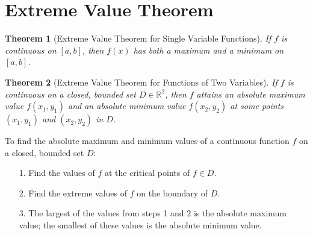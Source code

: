 \documentclass[10pt]{report}
\newtheorem{thm2}{Theorem}[section]
\begin{document}
\section{Extreme Value Theorem}
\begin{thm2}[Extreme Value Theorem for Single Variable Functions]
If $f$ is continuous on $[a,b]$, then $f(x)$ has both a maximum and a minimum on $[a,b]$.
\end{thm2}
\begin{thm2}[Extreme Value Theorem for Functions of Two Variables]
If $f$ is continuous on a closed, bounded set $D\in\mathbb{R}^2$, then $f$ attains an absolute maximum value $f(x_1,y_1)$ and an absolute minimum value $f(x_2,y_2)$ at some points $(x_1,y_1)$ and $(x_2,y_2)$ in $D$. 
\end{thm2}
To find the absolute maximum and minimum values of a continuous function $f$ on a closed, bounded set $D$:
\begin{itemize}
\item[1.] Find the values of $f$ at the critical points of $f\in D$.
\item[2.] Find the extreme values of $f$ on the boundary of $D$.
\item[3.] The largest of the values from steps 1 and 2 is the absolute maximum value; the smallest of these values is the absolute minimum value.
\end{itemize}
\end{document}
